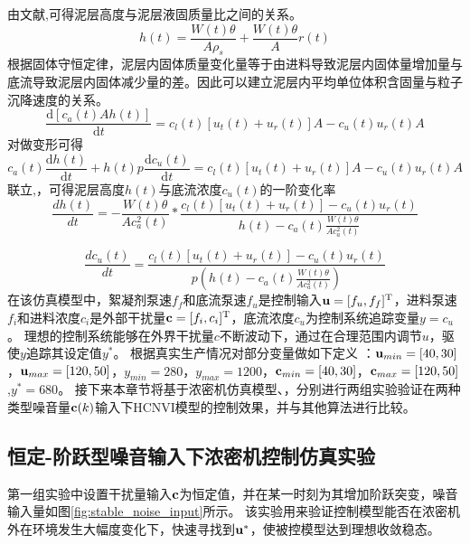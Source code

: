 由文献\cite{Tang2009},可得泥层高度与泥层液固质量比之间的关系。
 \begin{equation}
 \label{equ:H_ca}
h(t)=\frac{W(t) \theta}{A \rho_{s}}+\frac{W(t) \theta}{A}r(t)
\end{equation}
根据固体守恒定律，泥层内固体质量变化量等于由进料导致泥层内固体量增加量与底流导致泥层内固体减少量的差。因此可以建立泥层内平均单位体积含固量与粒子沉降速度的关系。
\begin{equation}
\label{equ:mass_balance} \frac{\mathrm{d}\left[c_{a}(t) A
h(t)\right]}{\mathrm{d} t}=c_{l}(t)\left[u_{t}(t)+u_{r}(t)\right]
A-c_{u}(t) u_{r}(t) A
\end{equation}
对做变形可得
\begin{equation}
\label{equ:mass_thickener_formula}
c_{a}(t) \frac{\mathrm{d} h(t)}{\mathrm{d} t}+h(t) p
\frac{\mathrm{d} c_{u}(t)}{\mathrm{d} t}=
c_{l}(t)\left[u_{t}(t)+u_{r}(t)\right] A -c_{u}(t) u_{r}(t) A
\end{equation}
联立,，可得泥层高度$h(t)$与底流浓度$c_u(t)$的一阶变化率
\begin{equation}
\label{equ:dh_dt} \frac{d h(t)}{d t}=-\frac{W(t) \theta}{A
c_{a}^{2}(t)}*\frac{ c_{l}(t)\left[u_{t}(t)+u_{r}(t)\right]-c_{u}(t)
u_{r}(t)}{h(t)-c_{a}(t) \frac{W(t) \theta}{A c_{a}^{2}(t)}}
\end{equation}

\begin{equation}
\label{equ:du_dt} \frac{d c_{u}(t)}{d
t}=\frac{c_{l}(t)\left[u_{t}(t)+u_{r}(t)\right]-c_{u}(t)
u_{r}(t)}{p(h(t)-c_{a}(t) \frac{W(t) \theta}{A c_{a}^{2}(t)})}
\end{equation}
在该仿真模型中，絮凝剂泵速$f_f$和底流泵速$f_u$是控制输入$\mathbf
u=[f_u,f_f]^{\rm T}$，进料泵速$f_i$和进料浓度$c_i$是外部干扰量$\mathbf
c=[f_i,c_i]^{\rm T}$，底流浓度$c_u$为控制系统追踪变量$y=c_u$。
理想的控制系统能够在外界干扰量$c$不断波动下，通过在合理范围内调节$u$，驱使$y$追踪其设定值$y^*$。
根据真实生产情况对部分变量做如下定义 ：$\mathbf u_{min}=[40,30]$，$\mathbf
u_{max}=[120,50]$，$y_{min}=280$，$y_{max}=1200$，$\mathbf
c_{min}=[40,30]$，$\mathbf c_{max}=[120,50]$,$y^*=680$。
接下来本章节将基于浓密机仿真模型、，分别进行两组实验验证在两种类型噪音量$\mathbf
c(k)$输入下HCNVI模型的控制效果，并与其他算法进行比较。
\subsection{恒定-阶跃型噪音输入下浓密机控制仿真实验}
\label{sec:vi_hdp_stable} 第一组实验中设置干扰量输入$\mathbf
c$为恒定值，并在某一时刻为其增加阶跃突变，噪音输入量如图\ref{fig:stable_noise_input}所示。
该实验用来验证控制模型能否在浓密机外在环境发生大幅度变化下，快速寻找到$\mathbf
u^*$，使被控模型达到理想收敛稳态。

